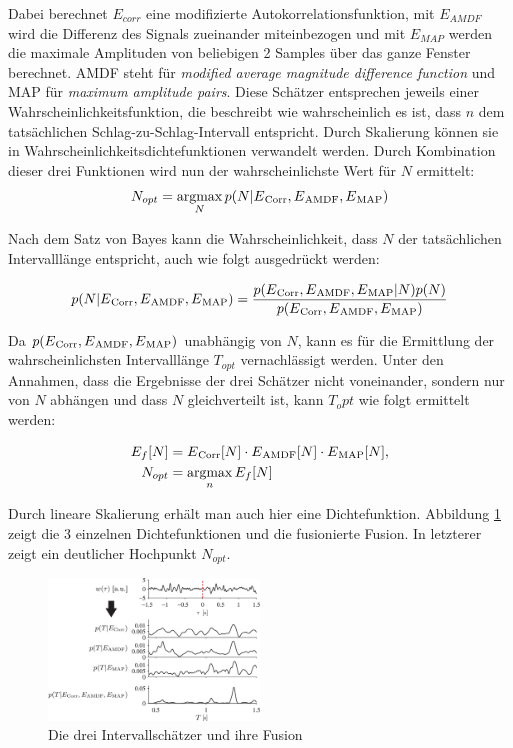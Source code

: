  	Dabei berechnet $E_{corr}$ eine modifizierte Autokorrelationsfunktion, mit $E_{AMDF}$ wird die Differenz des Signals zueinander miteinbezogen und mit $E_{MAP}$ werden die maximale Amplituden von beliebigen 2 Samples über das ganze Fenster berechnet. AMDF steht für \textit{modified average magnitude difference function} und MAP für \textit{maximum amplitude pairs}. Diese Schätzer entsprechen jeweils einer Wahrscheinlichkeitsfunktion, die beschreibt wie wahrscheinlich es ist, dass $n$ dem tatsächlichen Schlag-zu-Schlag-Intervall entspricht. Durch Skalierung können sie in Wahrscheinlichkeitsdichtefunktionen verwandelt werden. Durch Kombination dieser drei Funktionen wird nun der wahrscheinlichste Wert für $N$ ermittelt:
 	\[ N_{opt} = \operatorname*{argmax}_{N} p(N|E\textsubscript{Corr}, E\textsubscript{AMDF}, E\textsubscript{MAP}) \]
 	
	Nach dem Satz von Bayes kann die Wahrscheinlichkeit, dass $N$ der tatsächlichen Intervalllänge entspricht, auch wie folgt ausgedrückt werden:
	
	\[
		p(N|E\textsubscript{Corr}, E\textsubscript{AMDF}, E\textsubscript{MAP}) = \frac{p(E\textsubscript{Corr}, E\textsubscript{AMDF}, E\textsubscript{MAP} | N) p(N)}{p(E\textsubscript{Corr}, E\textsubscript{AMDF}, E\textsubscript{MAP})}
	\]
	
	Da $p(E\textsubscript{Corr}, E\textsubscript{AMDF}, E\textsubscript{MAP})$ unabhängig von $N$, kann es für die Ermittlung der wahrscheinlichsten Intervalllänge $T_{opt}$ vernachlässigt werden. Unter den Annahmen, dass die Ergebnisse der drei Schätzer nicht voneinander, sondern nur von $N$ abhängen und dass $N$ gleichverteilt ist, kann $T_opt$ wie folgt ermittelt werden:
	
	\begin{align*}
		E_f[N] &= E\textsubscript{Corr}[N] \cdot E\textsubscript{AMDF}[N] \cdot E\textsubscript{MAP}[N],\\
		N_{opt} &= \operatorname*{argmax}_{n} E_f[N]	
	\end{align*}
	
	Durch lineare Skalierung erhält man auch hier eine Dichtefunktion. Abbildung \ref{fig:estimator-fusion} zeigt die 3 einzelnen Dichtefunktionen und die fusionierte Fusion. In letzterer zeigt ein deutlicher Hochpunkt $N_{opt}$.
	
	 \begin{figure}[H]
		\centering
		\includegraphics[width=0.5\textwidth]{pic/estimator-fusion.png}
		\caption[Intervallschätzer nach \citeauthor{Bruser2013}]{Die drei Intervallschätzer und ihre Fusion}
		\label{fig:estimator-fusion}
	\end{figure}
	
